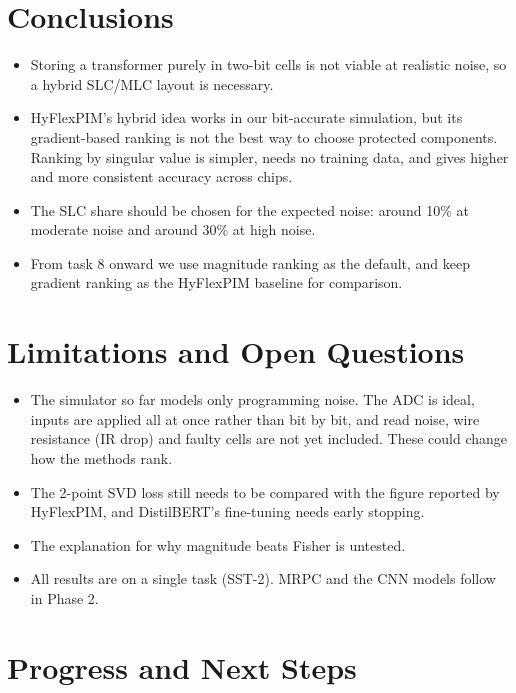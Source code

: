\documentclass[10pt,a4paper]{article}
\begin{document}
\section{Conclusions}
\begin{itemize}
\item Storing a transformer purely in two-bit cells is not viable at realistic noise, so a hybrid SLC/MLC
layout is necessary.
\item HyFlexPIM's hybrid idea works in our bit-accurate simulation, but its gradient-based ranking is not
the best way to choose protected components. Ranking by singular value is simpler, needs no training
data, and gives higher and more consistent accuracy across chips.
\item The SLC share should be chosen for the expected noise: around 10\% at moderate noise and around 30\%
at high noise.
\item From task 8 onward we use magnitude ranking as the default, and keep gradient ranking as the
HyFlexPIM baseline for comparison.
\end{itemize}

\section{Limitations and Open Questions}
\begin{itemize}
\item The simulator so far models only programming noise. The ADC is ideal, inputs are applied all at
once rather than bit by bit, and read noise, wire resistance (IR drop) and faulty cells are not yet
included. These could change how the methods rank.
\item The 2-point SVD loss still needs to be compared with the figure reported by HyFlexPIM, and
DistilBERT's fine-tuning needs early stopping.
\item The explanation for why magnitude beats Fisher is untested.
\item All results are on a single task (SST-2). MRPC and the CNN models follow in Phase 2.
\end{itemize}

\section{Progress and Next Steps}
\end{document}
